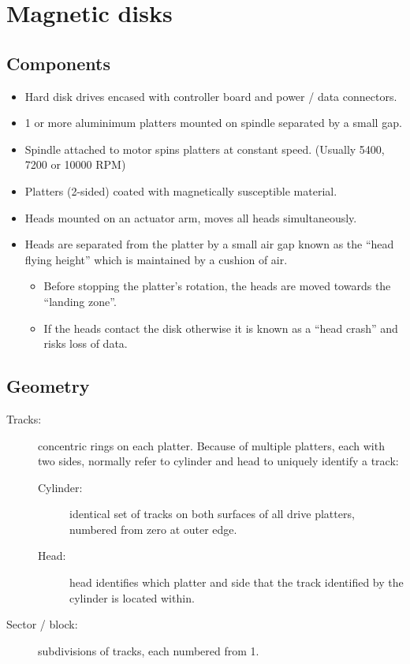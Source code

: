 \chapter{Magnetic disks}
\label{ch:magnetic-disks}

\section{Components}
\label{sec:components}


\begin{itemize}
\item
  Hard disk drives encased with controller board and power / data
  connectors.
\item
  1 or more aluminimum platters mounted on spindle separated by a small
  gap.
\item
  Spindle attached to motor spins platters at constant speed. (Usually
  5400, 7200 or 10000 RPM)
\item
  Platters (2-sided) coated with magnetically susceptible material.
\item
  Heads mounted on an actuator arm, moves all heads simultaneously.
\item
  Heads are separated from the platter by a small air gap known as the
  ``head flying height'' which is maintained by a cushion of air.

  \begin{itemize}
  \item
    Before stopping the platter's rotation, the heads are moved towards
    the ``landing zone''.
  \item
    If the heads contact the disk otherwise it is known as a ``head
    crash'' and risks loss of data.
  \end{itemize}
\end{itemize}

\section{Geometry}
\label{sec:geometry}


\begin{description}

\item[Tracks:]
concentric rings on each platter. Because of multiple platters, each
with two sides, normally refer to cylinder and head to uniquely identify
a track:

\begin{description}
\item[Cylinder:]
identical set of tracks on both surfaces of all drive platters, numbered
from zero at outer edge.
\item[Head:]
head identifies which platter and side that the track identified by the
cylinder is located within.
\end{description}

\item[Sector / block:]
subdivisions of tracks, each numbered from 1.
\end{description}

